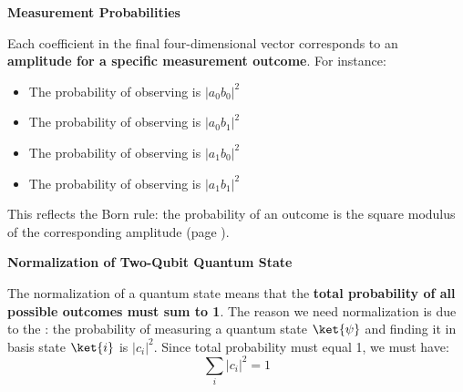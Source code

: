 \highspace
\begin{flushleft}
    \textcolor{Green3}{ \textbf{Measurement Probabilities}}
\end{flushleft}
Each coefficient in the final four-dimensional vector corresponds to an \textbf{amplitude for a specific measurement outcome}. For instance:
\begin{itemize}
    \item The probability of observing  is $\left|a_{0}b_{0}\right|^{2}$
    \item The probability of observing  is $\left|a_{0}b_{1}\right|^{2}$
    \item The probability of observing  is $\left|a_{1}b_{0}\right|^{2}$
    \item The probability of observing  is $\left|a_{1}b_{1}\right|^{2}$
\end{itemize}
This reflects the Born rule: the probability of an outcome is the square modulus of the corresponding amplitude (page \pageref{eq: Born rule}).

\highspace
\begin{flushleft}
    \textcolor{Green3}{ \textbf{Normalization of Two-Qubit Quantum State}}
\end{flushleft}
The normalization of a quantum state means that the \textbf{total probability of all possible outcomes must sum to 1}. The reason we need normalization is due to the : the probability of measuring a quantum state $\ket{\psi}$ and finding it in basis state $\ket{i}$ is $\left|c_{i}\right|^{2}$. Since total probability must equal 1, we must have:
\begin{equation*}
    \displaystyle\sum_{i} \left|c_{i}\right|^{2} = 1
\end{equation*}

